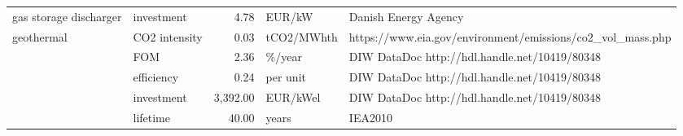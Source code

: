 \begin{longtable}{p{5cm}p{3cm}rp{3cm}p{11cm}}
gas storage discharger & investment &           4.78 &                            EUR/kW &                                                                                                                                                                                                                                                                                                                 Danish Energy Agency \\
geothermal & CO2 intensity &           0.03 &                        tCO2/MWhth &                                                                                                                                                                                                                                                                           https://www.eia.gov/environment/emissions/co2\_vol\_mass.php \\
                      & FOM &           2.36 &                            \%/year &                                                                                                                                                                                                                                                                                        DIW DataDoc http://hdl.handle.net/10419/80348 \\
                      & efficiency &           0.24 &                          per unit &                                                                                                                                                                                                                                                                                        DIW DataDoc http://hdl.handle.net/10419/80348 \\
                      & investment &       3,392.00 &                          EUR/kWel &                                                                                                                                                                                                                                                                                        DIW DataDoc http://hdl.handle.net/10419/80348 \\
                      & lifetime &          40.00 &                             years &                                                                                                                                                                                                                                                                                                                              IEA2010 \\

\end{longtable}
